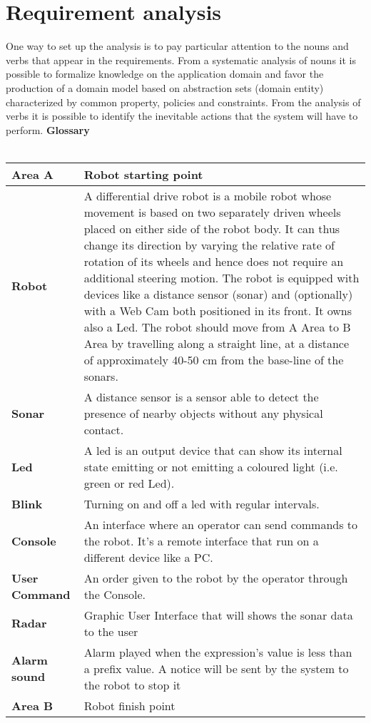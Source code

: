 \section{Requirement analysis}
One way to set up the analysis is to pay particular attention to the nouns and verbs that appear in the requirements. From a systematic analysis of nouns it is possible to formalize knowledge on the application domain and favor the production of a domain model based on abstraction sets (domain entity) characterized by common property, policies and constraints. From the analysis of verbs it is possible to identify the inevitable actions that the system will have to perform.
\clearpage
\textbf{Glossary}\\\\
\begin{tabular}{| l | p{10cm} |}
\hline
\textbf{Area A} & Robot starting point \\ \hline
\textbf{Robot} & A differential drive robot is a mobile robot whose movement is based on two separately driven wheels placed on either side of the robot body. It can thus change its direction by varying the relative rate of rotation of its wheels and hence does not require an additional steering motion. The robot is equipped with devices like a distance sensor (sonar) and (optionally) with a Web Cam both positioned in its front. It owns also a Led. The robot should move from A Area to B Area by travelling along a straight line, at a distance of approximately 40-50 cm from the base-line of the sonars. \\ \hline
\textbf{Sonar} & A distance sensor is a sensor able to detect the presence of nearby objects without any physical contact. \\ \hline
\textbf{Led} & A led is an output device that can show its internal state emitting or not emitting a coloured light (i.e. green or red Led). \\ \hline
\textbf{Blink} & Turning on and off a led with regular intervals. \\ \hline
\textbf{Console} & An interface where an operator can send commands to the robot. It's a remote interface that run on a different device like a PC.\\ \hline
\textbf{User Command} & An order given to the robot by the operator through the Console. \\ \hline
\textbf{Radar} & Graphic User Interface that will shows the sonar data to the user \\ \hline
\textbf{Alarm sound} & Alarm played when the expression's value is less than a prefix value. A notice will be sent by the system to the robot to stop it\\ \hline
\textbf{Area B} & Robot finish point \\
\hline
\end{tabular}



